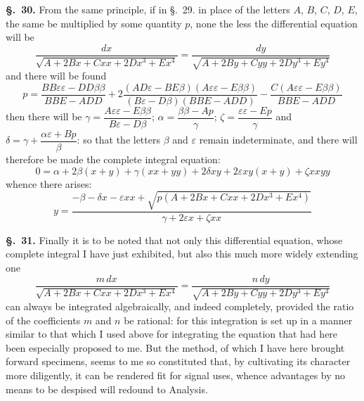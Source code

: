 \documentclass{article}
\begin{document}
\textbf{§.~30.} From the same principle, if in §.~29. in place of the letters $A$, $B$, $C$, $D$, $E$,
the same be multiplied by some quantity $p$, none the less the differential equation will be
\[ \frac{dx}{\sqrt{A + 2Bx + Cxx + 2Dx^{3} + Ex^{4}}} = \frac{dy}{\sqrt{A + 2By + Cyy + 2Dy^{3} + Ey^{4}}} \]
and there will be found
\[ p = \frac{BB\varepsilon\varepsilon - DD\beta\beta}{BBE - ADD}
   + 2\frac{(AD\varepsilon - BE\beta)(A\varepsilon\varepsilon - E\beta\beta)}{(B\varepsilon - D\beta)(BBE - ADD)}
   - \frac{C(A\varepsilon\varepsilon - E\beta\beta)}{BBE - ADD} \]
then there will be $\gamma = \dfrac{A\varepsilon\varepsilon - E\beta\beta}{B\varepsilon - D\beta}$;
$\alpha = \dfrac{\beta\beta - Ap}{\gamma}$; $\zeta = \dfrac{\varepsilon\varepsilon - Ep}{\gamma}$ and
$\delta = \gamma + \dfrac{\alpha\varepsilon + Bp}{\beta}$: so that the letters $\beta$ and $\varepsilon$ remain
indeterminate, and there will therefore be made the complete integral equation:
\[ 0 = \alpha + 2\beta(x+y) + \gamma(xx+yy) + 2\delta xy + 2\varepsilon xy(x+y) + \zeta xxyy \]
whence there arises:
\[ y = \frac{-\beta - \delta x - \varepsilon xx + \sqrt{p(A + 2Bx + Cxx + 2Dx^{3} + Ex^{4})}}{\gamma + 2\varepsilon x + \zeta xx} \]

\textbf{§.~31.} Finally it is to be noted that not only this differential equation, whose complete
integral I have just exhibited, but also this much more widely extending one
\[ \frac{m\,dx}{\sqrt{A + 2Bx + Cxx + 2Dx^{3} + Ex^{4}}} = \frac{n\,dy}{\sqrt{A + 2By + Cyy + 2Dy^{3} + Ey^{4}}} \]
can always be integrated algebraically, and indeed completely, provided the ratio of the
coefficients $m$ and $n$ be rational: for this integration is set up in a manner similar to that
which I used above for integrating the equation that had here been especially proposed to me. But
the method, of which
I have here brought forward specimens, seems to me so constituted that, by cultivating its character
more diligently, it can be rendered fit for signal uses, whence advantages by no means to be
despised will redound to Analysis.
\end{document}
